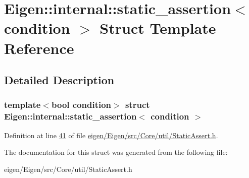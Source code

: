 \hypertarget{struct_eigen_1_1internal_1_1static__assertion}{}\section{Eigen\+:\+:internal\+:\+:static\+\_\+assertion$<$ condition $>$ Struct Template Reference}
\label{struct_eigen_1_1internal_1_1static__assertion}


\subsection{Detailed Description}
\subsubsection*{template$<$bool condition$>$\newline
struct Eigen\+::internal\+::static\+\_\+assertion$<$ condition $>$}



Definition at line \hyperlink{eigen_2_eigen_2src_2_core_2util_2_static_assert_8h_source_l00041}{41} of file \hyperlink{eigen_2_eigen_2src_2_core_2util_2_static_assert_8h_source}{eigen/\+Eigen/src/\+Core/util/\+Static\+Assert.\+h}.



The documentation for this struct was generated from the following file\+:\begin{DoxyCompactItemize}
\item 
eigen/\+Eigen/src/\+Core/util/\+Static\+Assert.\+h\end{DoxyCompactItemize}
